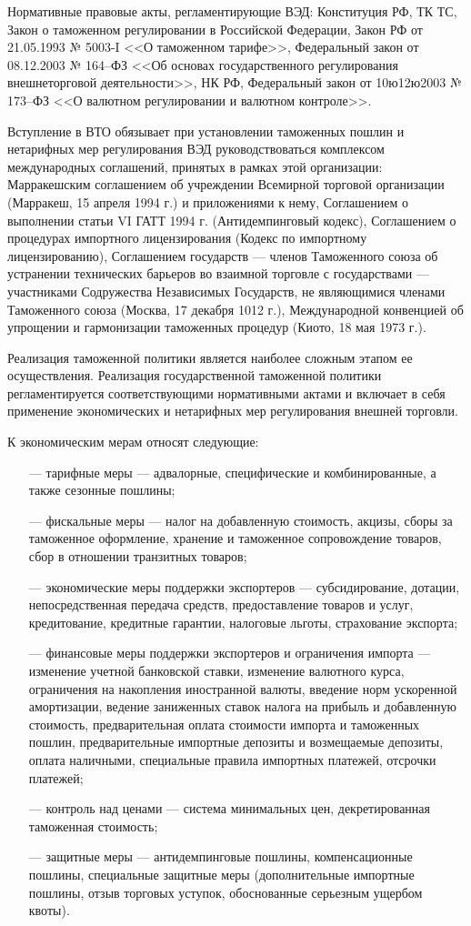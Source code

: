 Нормативные правовые акты, регламентирующие ВЭД: Конституция РФ, ТК ТС, Закон о таможенном регулировании в Российской Федерации, Закон РФ от 21.05.1993 № 5003-I <<О таможенном тарифе>>, Федеральный закон от 08.12.2003 № 164--ФЗ <<Об основах государственного регулирования внешнеторговой деятельности>>, НК РФ, Федеральный закон от 10ю12ю2003 № 173--ФЗ <<О валютном регулировании и валютном контроле>>.

Вступление в ВТО обязывает при установлении таможенных пошлин и нетарифных мер регулирования ВЭД руководствоваться комплексом международных соглашений, принятых в рамках этой организации: Марракешским соглашением об учреждении Всемирной торговой организации (Марракеш, 15 апреля 1994 г.) и приложениями к нему, Соглашением о выполнении статьи VI ГАТТ 1994 г. (Антидемпинговый кодекс), Соглашением о процедурах импортного лицензирования (Кодекс по импортному лицензированию), Соглашением государств --- членов Таможенного союза об устранении технических барьеров во взаимной торговле с государствами --- участниками Содружества Независимых Государств, не являющимися членами Таможенного союза (Москва, 17 декабря 1012 г.), Международной конвенцией об упрощении и гармонизации таможенных процедур (Киото, 18 мая 1973 г.).

Реализация таможенной политики является наиболее сложным этапом ее осуществления. Реализация государственной таможенной политики регламентируется соответствующими нормативными актами и включает в себя применение экономических и нетарифных мер регулирования внешней торговли.

К экономическим мерам относят следующие:
\begin{enumerate}
	\item [---] тарифные меры --- адвалорные, специфические и комбинированные, а также сезонные пошлины;
	\item [---] фискальные меры --- налог на добавленную стоимость, акцизы, сборы за таможенное оформление, хранение и таможенное сопровождение товаров, сбор в отношении транзитных товаров;
	\item [---] экономические меры поддержки экспортеров --- субсидирование, дотации, непосредственная передача средств, предоставление товаров и услуг, кредитование, кредитные гарантии, налоговые льготы, страхование экспорта;
	\item [---] финансовые меры поддержки экспортеров и ограничения импорта --- изменение учетной банковской ставки, изменение валютного курса, ограничения на накопления иностранной валюты, введение норм ускоренной амортизации, ведение заниженных ставок налога на прибыль и добавленную стоимость, предварительная оплата стоимости импорта и таможенных пошлин, предварительные импортные депозиты и возмещаемые депозиты, оплата наличными, специальные правила импортных платежей, отсрочки платежей;
	\item [---] контроль над ценами --- система минимальных цен, декретированная таможенная стоимость;
	\item [---] защитные меры --- антидемпинговые пошлины, компенсационные пошлины, специальные защитные меры (дополнительные импортные пошлины, отзыв торговых уступок, обоснованные серьезным ущербом квоты).
\end{enumerate}

